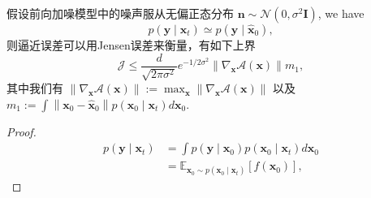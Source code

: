\begin{theorem}[定理1的证明]
    假设前向加噪模型中的噪声服从无偏正态分布 $\boldsymbol{n} \sim \mathcal{N}\left(0, \sigma^2 \boldsymbol{I}\right)$, we have
\begin{equation}
  p\left(\boldsymbol{y} \mid \boldsymbol{x}_t\right) \simeq p\left(\boldsymbol{y} \mid \hat{\boldsymbol{x}}_0\right),  
\end{equation}
则逼近误差可以用Jensen误差来衡量，有如下上界
\begin{equation}
    \mathcal{J} \leq \frac{d}{\sqrt{2 \pi \sigma^2}} e^{-1 / 2 \sigma^2}\left\|\nabla_{\boldsymbol{x}} \mathcal{A}(\boldsymbol{x})\right\| m_1,
\end{equation}
其中我们有 $\left\|\nabla_{\boldsymbol{x}} \mathcal{A}(\boldsymbol{x})\right\|:=\max _{\boldsymbol{x}}\left\|\nabla_{\boldsymbol{x}} \mathcal{A}(\boldsymbol{x})\right\|$ 以及 $m_1:=\int\left\|\boldsymbol{x}_0-\hat{\boldsymbol{x}}_0\right\| p\left(\boldsymbol{x}_0 \mid \boldsymbol{x}_t\right) d \boldsymbol{x}_0$.
\begin{proof}
 \begin{align}
p\left(\boldsymbol{y} \mid \boldsymbol{x}_t\right) & =\int p\left(\boldsymbol{y} \mid \boldsymbol{x}_0\right) p\left(\boldsymbol{x}_0 \mid \boldsymbol{x}_t\right) d \boldsymbol{x}_0 \\
& =\mathbb{E}_{\boldsymbol{x}_0 \sim p\left(\boldsymbol{x}_0 \mid \boldsymbol{x}_t\right)}\left[f\left(\boldsymbol{x}_0\right)\right],
\end{align}


\end{proof}
\end{theorem}

